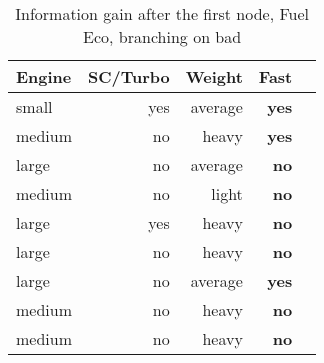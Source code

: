
\begin{table}[!htp]\centering
    \caption{Information gain after the first node, Fuel Eco, branching on bad}\label{firstNode:bad_feature}
    \scriptsize
    \begin{tabular}{lrrrr}\toprule
        \textbf{Engine} & \textbf{SC/Turbo} & \textbf{Weight} & \textbf{Fast} \\\midrule
        small           & yes               & average         & \textbf{yes}  \\
        medium          & no                & heavy           & \textbf{yes}  \\
        large           & no                & average         & \textbf{no}   \\
        medium          & no                & light           & \textbf{no}   \\
        large           & yes               & heavy           & \textbf{no}   \\
        large           & no                & heavy           & \textbf{no}   \\
        large           & no                & average         & \textbf{yes}  \\
        medium          & no                & heavy           & \textbf{no}   \\
        medium          & no                & heavy           & \textbf{no}   \\
        \bottomrule
    \end{tabular}
\end{table}